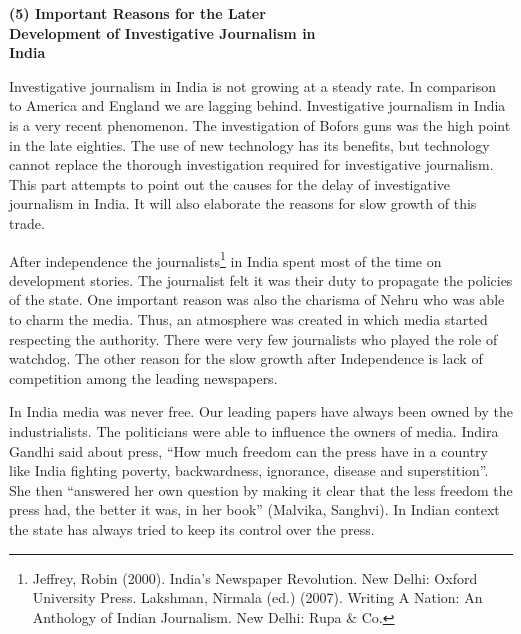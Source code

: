 \begin{multicols}{2}
\noi
{\large \bfseries (5) Important Reasons for the Later\\ Development of Investigative Journalism in\\ India}

\vspace{-.1cm}

\noi
Investigative journalism in India is not growing at a steady rate. In comparison to America and
England we are lagging behind. Investigative journalism in India is a very recent phenomenon.
The investigation of Bofors guns was the high point in the late eighties. The use of new
technology has its benefits, but technology cannot replace the thorough investigation required
for investigative journalism. This part attempts to point out the causes for the delay of
investigative journalism in India. It will also elaborate the reasons for slow growth of this trade.

\vspace{-.1cm}


\vspace{-.1cm}

\noi
After independence the journalists\footnote{Jeffrey, Robin (2000). India’s Newspaper Revolution. New Delhi: Oxford University Press. Lakshman, Nirmala (ed.) (2007). Writing A Nation: An Anthology of Indian Journalism. New Delhi: Rupa \& Co.} in India spent most of the time on development stories.
The journalist felt it was their duty to propagate the policies of the state. One important reason was also the charisma of Nehru who was able to charm the media. Thus, an atmosphere was
created in which media started respecting the authority. There were very few journalists who
played the role of watchdog. The other reason for the slow growth after Independence is lack
of competition among the leading newspapers.

\newpage


\vspace{-.1cm}

\noi
In India media was never free. Our leading papers have always been owned by the
industrialists. The politicians were able to influence the owners of media. Indira Gandhi said
about press, “How much freedom can the press have in a country like India fighting poverty,
backwardness, ignorance, disease and superstition”. She then “answered her own question by
making it clear that the less freedom the press had, the better it was, in her book” (Malvika,
Sanghvi). In Indian context the state has always tried to keep its control over the press.


\end{multicols}
